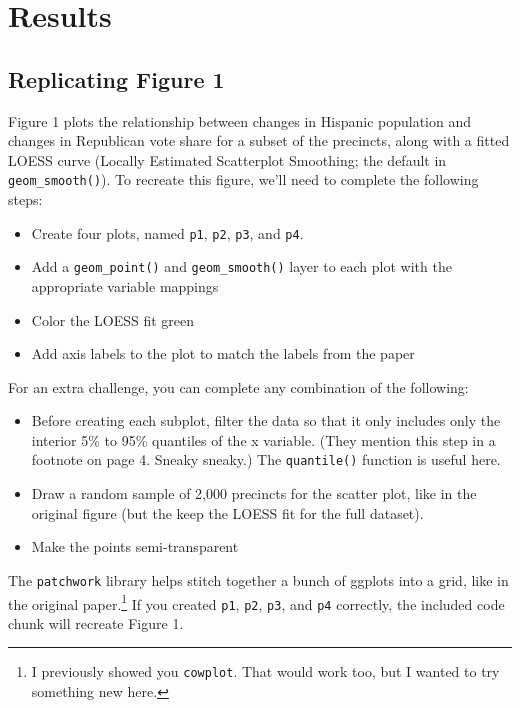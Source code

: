 \documentclass[12pt,halfline,a4paper,]{ouparticle}
\providecommand{\tightlist}{%
  \setlength{\itemsep}{0pt}\setlength{\parskip}{0pt}}
\begin{document}
\hypertarget{results}{%
\section{Results}\label{results}}

\hypertarget{replicating-figure-1}{%
\subsection{Replicating Figure 1}\label{replicating-figure-1}}

Figure 1 plots the relationship between changes in Hispanic population
and changes in Republican vote share for a subset of the precincts,
along with a fitted LOESS curve (Locally Estimated Scatterplot
Smoothing; the default in \texttt{geom\_smooth()}). To recreate this
figure, we'll need to complete the following steps:

\begin{itemize}
\tightlist
\item
  Create four plots, named \texttt{p1}, \texttt{p2}, \texttt{p3}, and
  \texttt{p4}.
\item
  Add a \texttt{geom\_point()} and \texttt{geom\_smooth()} layer to each
  plot with the appropriate variable mappings
\item
  Color the LOESS fit green
\item
  Add axis labels to the plot to match the labels from the paper
\end{itemize}

\noindent For an extra challenge, you can complete any combination of
the following:

\begin{itemize}
\tightlist
\item
  Before creating each subplot, filter the data so that it only includes
  only the interior 5\% to 95\% quantiles of the x variable. (They
  mention this step in a footnote on page 4. Sneaky sneaky.) The
  \texttt{quantile()} function is useful here.
\item
  Draw a random sample of 2,000 precincts for the scatter plot, like in
  the original figure (but the keep the LOESS fit for the full dataset).
\item
  Make the points semi-transparent
\end{itemize}

The \texttt{patchwork} library helps stitch together a bunch of ggplots
into a grid, like in the original paper.\footnote{I previously showed
  you \texttt{cowplot}. That would work too, but I wanted to try
  something new here.} If you created \texttt{p1}, \texttt{p2},
\texttt{p3}, and \texttt{p4} correctly, the included code chunk will
recreate Figure 1.
\end{document}
